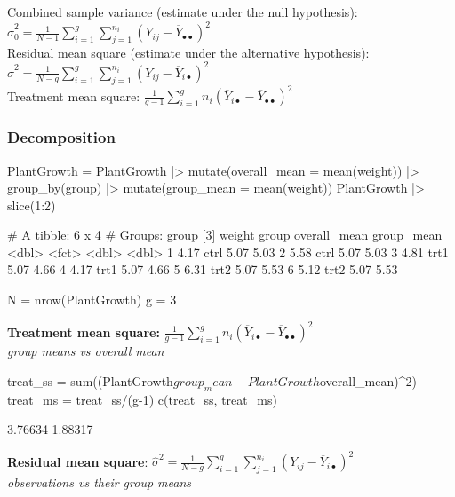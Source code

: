 \documentclass[a4paper]{article}
\begin{document}
Combined sample variance (estimate under the null hypothesis): \( \hat{\sigma}^2_0 = \frac{1}{N-1}\sum_{i=1}^g\sum_{j=1}^{n_i}(Y_{ij}-\overline Y_{\bullet\bullet})^2 \)\\
Residual mean square (estimate under the alternative hypothesis): \( \hat\sigma^2=\frac{1}{N-g}\sum_{i=1}^g\sum_{j=1}^{n_i}(Y_{ij}-\overline Y_{i\bullet})^2 \)\\
Treatment mean square: \( \frac{1}{g-1}\sum_{i=1}^g n_i (\overline Y_{i\bullet}-\overline Y_{\bullet\bullet})^2 \)
\subsubsection{Decomposition}
\begin{Schunk}
\begin{Sinput}
PlantGrowth = PlantGrowth |> 
  mutate(overall_mean = mean(weight)) |> 
  group_by(group) |> 
  mutate(group_mean = mean(weight))
PlantGrowth |> slice(1:2)
\end{Sinput}
\begin{Soutput}
# A tibble: 6 x 4
# Groups:   group [3]
  weight group overall_mean group_mean
   <dbl> <fct>        <dbl>      <dbl>
1   4.17 ctrl          5.07       5.03
2   5.58 ctrl          5.07       5.03
3   4.81 trt1          5.07       4.66
4   4.17 trt1          5.07       4.66
5   6.31 trt2          5.07       5.53
6   5.12 trt2          5.07       5.53
\end{Soutput}
\begin{Sinput}
N = nrow(PlantGrowth)
g = 3
\end{Sinput}
\end{Schunk}
\textbf{Treatment mean square:} \( \frac{1}{g-1}\sum_{i=1}^g n_i (\overline Y_{i\bullet}-\overline Y_{\bullet\bullet})^2 \)\\
\textit{group means vs overall mean}
\begin{Schunk}
\begin{Sinput}
treat_ss = sum((PlantGrowth$group_mean - PlantGrowth$overall_mean)^2)
treat_ms = treat_ss/(g-1)
c(treat_ss, treat_ms)
\end{Sinput}
\begin{Soutput}
[1] 3.76634 1.88317
\end{Soutput}
\end{Schunk}
\textbf{Residual mean square}: \( \hat\sigma^2=\frac{1}{N-g}\sum_{i=1}^g\sum_{j=1}^{n_i}(Y_{ij}-\overline Y_{i\bullet})^2 \)\\
\textit{observations vs their group means}
\end{document}
